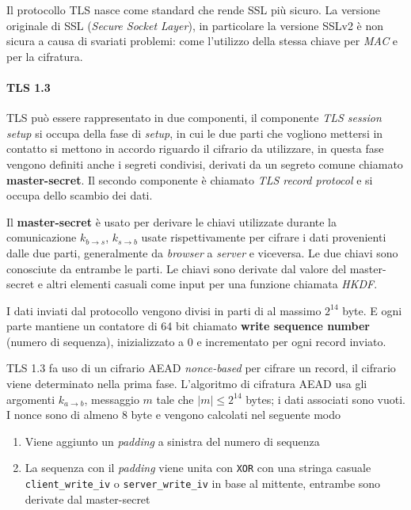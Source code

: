 Il protocollo TLS nasce come standard che rende SSL più sicuro. La versione originale di SSL (\emph{Secure Socket Layer}), in particolare la versione SSLv2 è non sicura a causa di svariati problemi: come l'utilizzo della stessa chiave per \emph{MAC} e per la cifratura. 

\paragraph{TLS 1.3} TLS può essere rappresentato in due componenti, il componente \emph{TLS session setup} si occupa della fase di \emph{setup}, in cui le due parti che vogliono mettersi in contatto si mettono in accordo riguardo il cifrario da utilizzare, in questa fase vengono definiti anche i segreti condivisi, derivati da un segreto comune chiamato \textbf{master-secret}. Il secondo componente è chiamato \emph{TLS record protocol} e si occupa dello scambio dei dati.

\vspace{1em}
Il \textbf{master-secret} è usato per derivare le chiavi utilizzate durante la comunicazione $k_{b \to s}$, $k_{s \to b}$ usate rispettivamente per cifrare i dati provenienti dalle due parti, generalmente da \emph{browser} a \emph{server} e viceversa. Le due chiavi sono conosciute da entrambe le parti. Le chiavi sono derivate dal valore del master-secret e altri elementi casuali come input per una funzione chiamata \emph{HKDF}.

\vspace{1em}\noindent
I dati inviati dal protocollo vengono divisi in parti di al massimo $2^{14}$ byte. E ogni parte mantiene un contatore di 64 bit chiamato \textbf{write sequence number} (numero di sequenza), inizializzato a 0 e incrementato per ogni record inviato. 

TLS 1.3 fa uso di un cifrario AEAD \emph{nonce-based} per cifrare un record, il cifrario viene determinato nella prima fase. L'algoritmo di cifratura AEAD usa gli argomenti $k_{a\to b}$, messaggio $m $ tale che $|m| \leq 2^{14}$ bytes; i dati associati sono vuoti. I nonce sono di almeno 8 byte e vengono calcolati nel seguente modo

\begin{enumerate}
    \item Viene aggiunto un \emph{padding} a sinistra del numero di sequenza
    \item La sequenza con il \emph{padding} viene unita con \texttt{XOR} con una stringa casuale \texttt{client\_write\_iv} o \texttt{server\_write\_iv} in base al mittente, entrambe sono derivate dal master-secret 
\end{enumerate}

